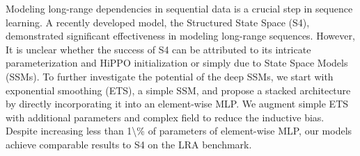 Modeling long-range dependencies in sequential data is a crucial step in sequence learning.  A recently developed model, the Structured State Space (S4),  demonstrated significant effectiveness in modeling long-range sequences. However, It is unclear whether the success of S4 can be attributed to its intricate parameterization and HiPPO initialization or simply due to State Space Models (SSMs). To further investigate the potential of the deep SSMs, we start with exponential smoothing (ETS), a simple SSM, and propose a stacked architecture by directly incorporating it into an element-wise MLP. We augment simple ETS with additional parameters and complex field to reduce the inductive bias. Despite increasing less than 1\textbackslash{}\% of parameters of element-wise MLP, our models achieve comparable results to S4 on the LRA benchmark.